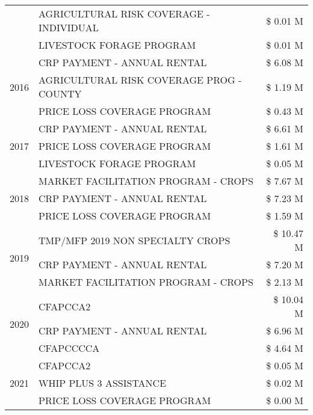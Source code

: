 \begin{tabular}{llr}
 & AGRICULTURAL RISK COVERAGE - INDIVIDUAL & \$ 0.01 M \\
 & LIVESTOCK FORAGE PROGRAM & \$ 0.01 M \\
\cline{1-3}
\multirow[t]{3}{*}{2016} & CRP PAYMENT - ANNUAL RENTAL & \$ 6.08 M \\
 & AGRICULTURAL RISK COVERAGE PROG - COUNTY & \$ 1.19 M \\
 & PRICE LOSS COVERAGE PROGRAM & \$ 0.43 M \\
\cline{1-3}
\multirow[t]{3}{*}{2017} & CRP PAYMENT - ANNUAL RENTAL & \$ 6.61 M \\
 & PRICE LOSS COVERAGE PROGRAM & \$ 1.61 M \\
 & LIVESTOCK FORAGE PROGRAM & \$ 0.05 M \\
\cline{1-3}
\multirow[t]{3}{*}{2018} & MARKET FACILITATION PROGRAM - CROPS & \$ 7.67 M \\
 & CRP PAYMENT - ANNUAL RENTAL & \$ 7.23 M \\
 & PRICE LOSS COVERAGE PROGRAM & \$ 1.59 M \\
\cline{1-3}
\multirow[t]{3}{*}{2019} & TMP/MFP 2019 NON SPECIALTY CROPS & \$ 10.47 M \\
 & CRP PAYMENT - ANNUAL RENTAL & \$ 7.20 M \\
 & MARKET FACILITATION PROGRAM - CROPS & \$ 2.13 M \\
\cline{1-3}
\multirow[t]{3}{*}{2020} & CFAPCCA2 & \$ 10.04 M \\
 & CRP PAYMENT - ANNUAL RENTAL & \$ 6.96 M \\
 & CFAPCCCCA & \$ 4.64 M \\
\cline{1-3}
\multirow[t]{3}{*}{2021} & CFAPCCA2 & \$ 0.05 M \\
 & WHIP PLUS 3 ASSISTANCE & \$ 0.02 M \\
 & PRICE LOSS COVERAGE PROGRAM & \$ 0.00 M \\
\cline{1-3}
\bottomrule
\end{tabular}
